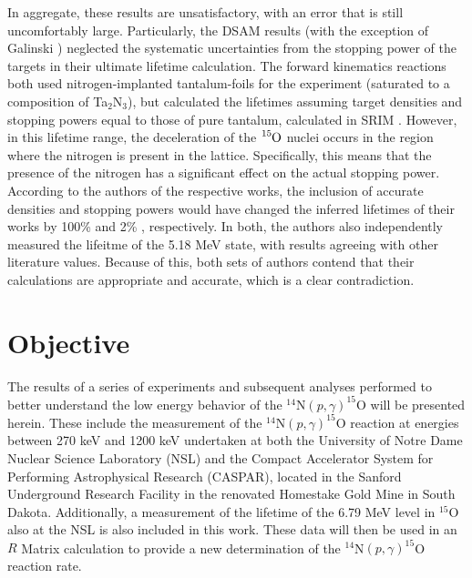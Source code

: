 In aggregate, these results are unsatisfactory, with an error that is still uncomfortably large. Particularly, the DSAM results (with the exception of Galinski \cite{Galinski2014}) neglected the systematic uncertainties from the stopping power of the targets in their ultimate lifetime calculation. The forward kinematics reactions \cite{Bertone2001, Schurmann2008} both used nitrogen-implanted tantalum-foils for the experiment (saturated to a composition of Ta$_{2}$N$_{3}$), but calculated the lifetimes assuming target densities and stopping powers equal to those of pure tantalum, calculated in SRIM \cite{Ziegler2010}. However, in this lifetime range, the deceleration of the $\ce{^{15}O}$ nuclei occurs in the region where the nitrogen is present in the lattice. Specifically, this means that the presence of the nitrogen has a significant effect on the actual stopping power. According to the authors of the respective works, the inclusion of accurate densities and stopping powers would have changed the inferred lifetimes of their works by 100\% \cite{Bertone2001} and 2\% \cite{Schurmann2008}, respectively. In both, the authors also independently measured the lifeitme of the 5.18 MeV state, with results agreeing with other literature values. Because of this, both sets of authors contend that their calculations are appropriate and accurate, which is a clear contradiction.





\section{Objective}
\label{sec: thesis outline}

The results of a series of experiments and subsequent analyses performed to better understand the low energy behavior of the $^{14}$N$\left( p,\gamma \right) ^{15}$O will be presented herein. These include the measurement of the $^{14}$N$\left( p,\gamma \right) ^{15}$O reaction at energies between 270 keV and 1200 keV undertaken at both the University of Notre Dame Nuclear Science Laboratory (NSL) and the Compact Accelerator System for Performing Astrophysical Research (CASPAR), located in the Sanford Underground Research Facility in the renovated Homestake Gold Mine in South Dakota. Additionally, a measurement of the lifetime of the 6.79 MeV level in $^{15}$O also at the NSL is also included in this work. These data will then be used in an $R$ Matrix calculation to provide a new determination of the $^{14}$N$\left( p,\gamma \right) ^{15}$O reaction rate.

